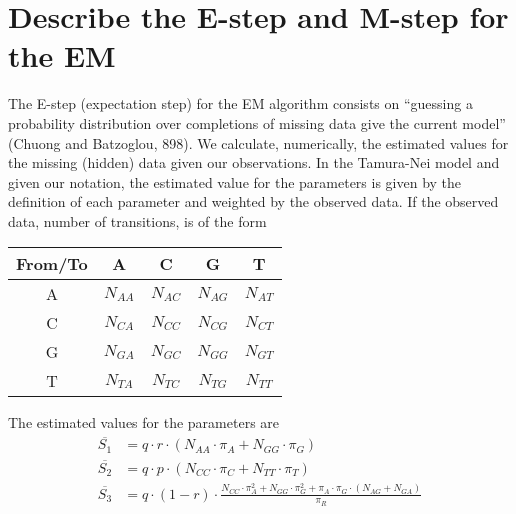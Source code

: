 \documentclass[12pt,twoside]{article}
\begin{document}
\section{Describe the E-step and M-step for the EM}
The E-step (expectation step) for the EM algorithm consists on “guessing a probability distribution over completions of missing data give the current model” (Chuong and Batzoglou, 898). We calculate, numerically, the estimated values for the missing (hidden) data given our observations. In the Tamura-Nei model and given our notation, the estimated value for the parameters is given by the definition of each parameter and weighted by the observed data. If the observed data, number of transitions, is of the form
\begin{center}
	\begin{tabular}{|c|c|c|c|c|}
		\hline
		From/To & A & C & G & T \\ \hline
		A & $N_{AA}$ & $N_{AC}$ & $N_{AG}$ & $N_{AT}$ \\ \hline
		C & $N_{CA}$ & $N_{CC}$ & $N_{CG}$ & $N_{CT}$ \\ \hline
		G & $N_{GA}$ & $N_{GC}$ & $N_{GG}$ & $N_{GT}$ \\ \hline
		T & $N_{TA}$ & $N_{TC}$ & $N_{TG}$ & $N_{TT}$ \\
		\hline
	\end{tabular}
\end{center}
The estimated values for the parameters are
\begin{align}
\overline{S_{1}} &= q \cdot r \cdot (N_{AA} \cdot \pi_{A} + N_{GG} \cdot \pi_{G}) \\
\overline{S_{2}} &= q \cdot p \cdot (N_{CC} \cdot \pi_{C} + N_{TT} \cdot \pi_{T}) \\
\overline{S_{3}} &= q \cdot (1 - r) \cdot \frac{N_{CC} \cdot \pi_{A}^2 + N_{GG} \cdot \pi_{G}^2+\pi_{A} \cdot \pi_{G} \cdot (N_{AG} + N_{GA})}{\pi_{R}}
\end{align}
\end{document}
